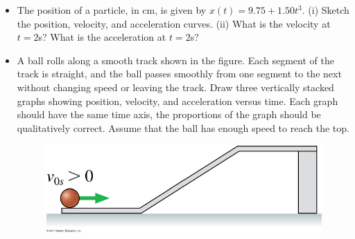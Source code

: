 \begin{itemize}
\item The position of a particle, in cm, is given by $x(t)=9.75+1.50t^3$. (i) Sketch the position, velocity, and acceleration curves. (ii) What is the velocity at $t=2$s? What is the acceleration at $t=2$s? 

  \vspace{5cm}

\item A ball rolls along a smooth track shown in the figure. Each segment of the track is straight, and the ball passes smoothly from one segment to the next without changing speed or leaving the track. Draw three vertically stacked graphs showing position, velocity, and acceleration versus time. Each graph should have the same time axis, the proportions of the graph should be qualitatively correct. Assume that the ball has enough speed to reach the top.

  \begin{figure}[h]
    \begin{center}
      \includegraphics[]{./figs/P02_43_Figure.pdf}
    \end{center}  
  \end{figure}
  
  \end{itemize}

\clearpage

